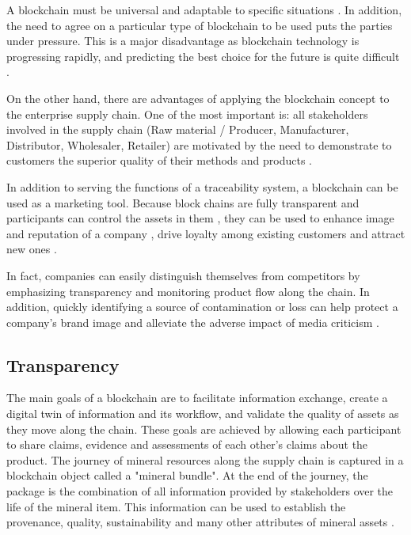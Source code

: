 A blockchain must be universal and adaptable to specific situations \cite{valenta2017comparison}. In addition, the need to agree on a particular type of blockchain to be used puts the parties under pressure. This is a major disadvantage as blockchain technology is progressing rapidly, and predicting the best choice for the future is quite difficult \cite{galvez2018future}.

On the other hand, there are advantages of applying the blockchain concept to the enterprise supply chain. One of the most important is: all stakeholders involved in the supply chain (Raw material / Producer, Manufacturer, Distributor, Wholesaler, Retailer) are motivated by the need to demonstrate to customers the superior quality of their methods and products \cite{lu2017adaptable}. 

In addition to serving the functions of a traceability system, a blockchain can be used as a marketing tool. Because block chains are fully transparent\cite{iansiti2017truth} and participants can control the assets in them \cite{liao2011food}, they can be used to enhance image and reputation of a company \cite{van2007essentials}, drive loyalty among existing customers \cite{pizzuti2015global} and attract new ones \cite{svensson2009transparency}. 

In fact, companies can easily distinguish themselves from competitors by emphasizing transparency and monitoring product flow along the chain. In addition, quickly identifying a source of contamination or loss can help protect a company's brand image \cite{mejia2010traceability} and alleviate the adverse impact of media criticism \cite{dabbene2011food}.

\subsection{Transparency}\label{sec:transparency}

The main goals of a blockchain are to facilitate information exchange, create a digital twin of information and its workflow, and validate the quality of assets as they move along the chain. These goals are achieved by allowing each participant to share claims, evidence and assessments of each other's claims about the product. The journey of mineral resources along the supply chain is captured in a blockchain object called a "mineral bundle". At the end of the journey, the package is the combination of all information provided by stakeholders over the life of the mineral item. This information can be used to establish the provenance, quality, sustainability and many other attributes of mineral assets \cite{martin2017technology}.

